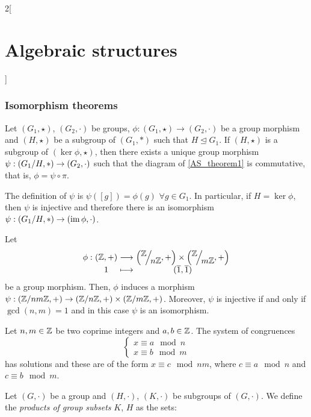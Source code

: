 \documentclass[../../../main_math.tex]{subfiles}
\begin{document}
\begin{multicols}{2}[\section{Algebraic structures}]
  \subsubsection{Isomorphism theorems}
  \begin{theorem}
    Let $(G_1,\star)$, $(G_2,\cdot)$ be groups, $\phi:(G_1,\star)\rightarrow (G_2,\cdot)$ be a group morphism and $(H,\star)$ be a subgroup of $(G_1,*)$ such that $H\unlhd G_1$. If $(H,\star)$ is a subgroup of $(\ker\phi,\star)$, then there exists a unique group morphism $\psi:(\quot{G_1}{H},*)\rightarrow (G_2,\cdot)$ such that the diagram of \cref{AS_theorem1} is commutative, that is, $\phi=\psi\circ\pi$.
    \begin{center}
      \begin{minipage}{\linewidth}
        \centering
        
        \label{AS_theorem1}
      \end{minipage}
    \end{center}
    The definition of $\psi$ is $\psi([g])=\phi(g)$ $\forall g\in G_1$.
    In particular, if $H=\ker\phi$, then $\psi$ is injective and therefore there is an isomorphism $\psi:(\quot{G_1}{H},*)\rightarrow (\im\phi,\cdot)$.
  \end{theorem}
  \begin{theorem}
    Let
    \begin{equation*}
      \function{\phi}{(\ZZ,+)}{\displaystyle\left(\quot{\ZZ }{n\ZZ },+\right)\times\left(\quot{\ZZ }{m\ZZ },+\right)}{1}{(\overline{1},\overline{1})}
    \end{equation*}
    be a group morphism. Then, $\phi$ induces a morphism $\psi:(\mathbb{Z} /nm\mathbb{Z},+) \rightarrow(\mathbb{Z} /n\mathbb{Z},+) \times(\mathbb{Z} /m\mathbb{Z},+) $. Moreover, $\psi$ is injective if and only if $\gcd(n,m)=1$ and in this case $\psi$ is an isomorphism.
  \end{theorem}
  \begin{corollary}
    Let $n,m\in\mathbb{Z} $ be two coprime integers and $a,b\in\mathbb{Z} $. The system of congruences $$
      \begin{cases}
        x\equiv a\mod{n} \\
        x\equiv b\mod{m}
      \end{cases}$$ has solutions and these are of the form $x\equiv c\mod{nm}$, where $c\equiv a\mod{n}$ and $c\equiv b\mod{m}$.
  \end{corollary}
  \begin{definition}
    Let $(G,\cdot)$ be a group and $(H,\cdot)$, $(K,\cdot)$ be subgroups of $(G,\cdot)$. We define the \emph{products of group subsets} $K$, $H$ as the sets:

\end{definition}
\end{multicols}
\end{document}
